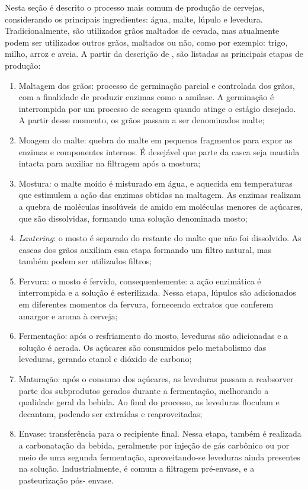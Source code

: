 Nesta seção é descrito o processo mais comum de produção de cervejas, considerando os principais
ingredientes: água, malte, lúpulo e levedura. Tradicionalmente, são utilizados grãos maltados de cevada,
mas atualmente podem ser utilizados outros grãos, maltados ou não, como por exemplo: trigo, milho, arroz e aveia.
A partir da descrição de , são listadas as principais etapas de produção:


\begin{enumerate}
    \item Maltagem dos grãos: processo de germinação parcial e controlada dos grãos, com a finalidade
de produzir enzimas como a amilase. A germinação é interrompida por um processo de secagem quando atinge o estágio desejado.
A partir desse momento, os grãos passam a ser denominados malte;
    \item Moagem do malte: quebra do malte em pequenos fragmentos para expor as enzimas e componentes internos. É desejável
que parte da casca seja mantida intacta para auxiliar na filtragem após a mostura;
    \item Mostura: o malte moído é misturado em água, e aquecida em temperaturas
que estimulem a ação das enzimas obtidas na maltagem. As enzimas
realizam a quebra de moléculas insolúveis de amido em moléculas menores
de açúcares, que são dissolvidas, formando uma solução denominada mosto;
    \item \textit{Lautering}: o mosto é separado do restante do malte que não foi dissolvido. As
cascas dos grãos auxiliam essa etapa formando um filtro natural, mas também podem ser utilizados filtros;
    \item Fervura: o mosto é fervido, consequentemente: a ação enzimática é
interrompida e a solução é esterilizada. Nessa etapa, lúpulos são adicionados em diferentes
momentos da fervura, fornecendo extratos que conferem amargor e aroma à cerveja;
    \item Fermentação: após o resfriamento do mosto, leveduras são adicionadas e a solução é aerada. 
Os açúcares são consumidos pelo metabolismo das leveduras, gerando etanol e dióxido de carbono;
    \item Maturação: após o consumo dos açúcares, as leveduras passam a reabsorver parte dos
subprodutos gerados durante a fermentação, melhorando a qualidade geral da bebida. Ao final do processo, as leveduras floculam e decantam, podendo ser extraídas e reaproveitadas;
    \item Envase: transferência para o recipiente final. Nessa etapa, também é
realizada a carbonatação da bebida, geralmente por injeção de gás carbônico
ou por meio de uma segunda fermentação, aproveitando-se leveduras ainda presentes na solução.
Industrialmente, é comum a filtragem pré-envase, e a pasteurização pós-
envase.
\end{enumerate}

